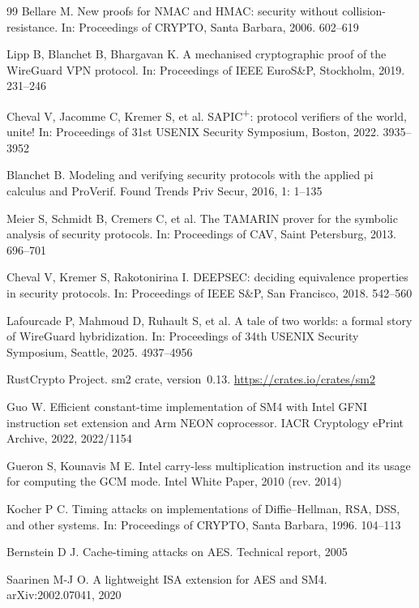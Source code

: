 \documentclass{SCIS2026}
\begin{document}
\begin{thebibliography}{99}
 Bellare M. New proofs for NMAC and HMAC: security without collision-resistance. In: Proceedings of CRYPTO, Santa Barbara, 2006. 602--619

 Lipp B, Blanchet B, Bhargavan K. A mechanised cryptographic proof of the WireGuard VPN protocol. In: Proceedings of IEEE EuroS\&P, Stockholm, 2019. 231--246

 Cheval V, Jacomme C, Kremer S, et al. SAPIC\textsuperscript{+}: protocol verifiers of the world, unite! In: Proceedings of 31st USENIX Security Symposium, Boston, 2022. 3935--3952

 Blanchet B. Modeling and verifying security protocols with the applied pi calculus and ProVerif. Found Trends Priv Secur, 2016, 1: 1--135

 Meier S, Schmidt B, Cremers C, et al. The TAMARIN prover for the symbolic analysis of security protocols. In: Proceedings of CAV, Saint Petersburg, 2013. 696--701

 Cheval V, Kremer S, Rakotonirina I. DEEPSEC: deciding equivalence properties in security protocols. In: Proceedings of IEEE S\&P, San Francisco, 2018. 542--560

 Lafourcade P, Mahmoud D, Ruhault S, et al. A tale of two worlds: a formal story of WireGuard hybridization. In: Proceedings of 34th USENIX Security Symposium, Seattle, 2025. 4937--4956

 RustCrypto Project. sm2 crate, version~0.13. \url{https://crates.io/crates/sm2}

 Guo W. Efficient constant-time implementation of SM4 with Intel GFNI instruction set extension and Arm NEON coprocessor. IACR Cryptology ePrint Archive, 2022, 2022/1154

 Gueron S, Kounavis M E. Intel carry-less multiplication instruction and its usage for computing the GCM mode. Intel White Paper, 2010 (rev. 2014)

 Kocher P C. Timing attacks on implementations of Diffie--Hellman, RSA, DSS, and other systems. In: Proceedings of CRYPTO, Santa Barbara, 1996. 104--113

 Bernstein D J. Cache-timing attacks on AES. Technical report, 2005

 Saarinen M-J O. A lightweight ISA extension for AES and SM4. arXiv:2002.07041, 2020

\end{thebibliography}
\end{document}
